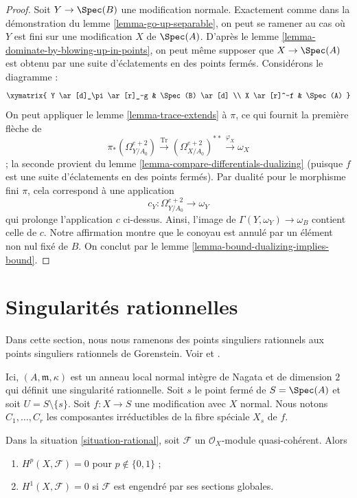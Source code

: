 \begin{proof}
\medskip\noindent Soit $Y \to \Spec(B)$ une modification normale. Exactement comme dans la démonstration du lemme \ref{lemma-go-up-separable}, on peut se ramener au cas où $Y$ est fini sur une modification $X$ de $\Spec(A)$. D'après le lemme \ref{lemma-dominate-by-blowing-up-in-points}, on peut même supposer que $X \to \Spec(A)$ est obtenu par une suite d'éclatements en des points fermés. Considérons le diagramme : $$
\xymatrix{
Y \ar[d]_\pi \ar[r]_-g & \Spec(B) \ar[d] \\
X \ar[r]^-f & \Spec(A)
}
$$ On peut appliquer le lemme \ref{lemma-trace-extends} à $\pi$, ce qui fournit la première flèche de $$
\pi_*(\Omega^{e + 2}_{Y/A_0})
\xrightarrow{\text{Tr}}
(\Omega^{e + 2}_{X/A_0})^{**}
\xrightarrow{\varphi_X}
\omega_X
$$ ; la seconde provient du lemme \ref{lemma-compare-differentials-dualizing} (puisque $f$ est une suite d'éclatements en des points fermés). Par dualité pour le morphisme fini $\pi$, cela correspond à une application $$
c_Y : \Omega^{e + 2}_{Y/A_0} \longrightarrow \omega_Y
$$ qui prolonge l'application $c$ ci-dessus. Ainsi, l'image de $\Gamma(Y, \omega_Y) \to \omega_B$ contient celle de $c$. Notre affirmation montre que le conoyau est annulé par un élément non nul fixé de $B$. On conclut par le lemme \ref{lemma-bound-dualizing-implies-bound}. \end{proof}






\section{Singularités rationnelles} \label{section-rational-singularities}

\noindent Dans cette section, nous nous ramenons des points singuliers rationnels aux points singuliers rationnels de Gorenstein. Voir \cite{Lipman-rational} et \cite{Mattuck}.

\begin{situation} \label{situation-rational} Ici, $(A, \mathfrak m, \kappa)$ est un anneau local normal intègre de Nagata et de dimension $2$ qui définit une singularité rationnelle. Soit $s$ le point fermé de $S = \Spec(A)$ et soit $U = S \setminus \{s\}$. Soit $f : X \to S$ une modification avec $X$ normal. Nous notons $C_1, \ldots, C_r$ les composantes irréductibles de la fibre spéciale $X_s$ de $f$. \end{situation}

\begin{lemma} \label{lemma-globally-generated} Dans la situation \ref{situation-rational}, soit $\mathcal{F}$ un $\mathcal{O}_X$-module quasi-cohérent. Alors \begin{enumerate} \item $H^p(X, \mathcal{F}) = 0$ pour $p \not \in \{0, 1\}$ ; \item $H^1(X, \mathcal{F}) = 0$ si $\mathcal{F}$ est engendré par ses sections globales. \end{enumerate} \end{lemma}

